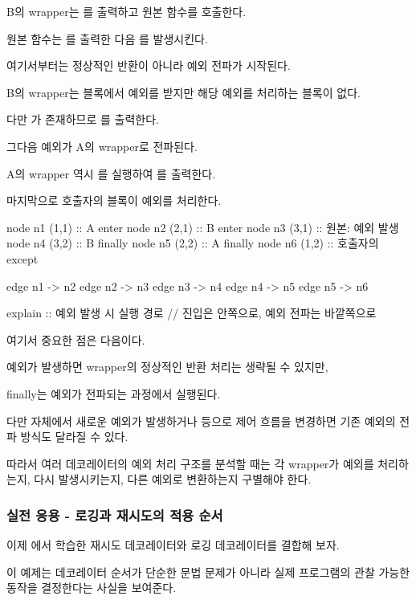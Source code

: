 B의 wrapper는 를 출력하고 원본  함수를 호출한다.

원본 함수는 를 출력한 다음 를 발생시킨다.

여기서부터는 정상적인 반환이 아니라 예외 전파가 시작된다.

B의 wrapper는  블록에서 예외를 받지만 해당 예외를 처리하는  블록이 없다.

다만 가 존재하므로 를 출력한다.

그다음 예외가 A의 wrapper로 전파된다.

A의 wrapper 역시 를 실행하여 를 출력한다.

마지막으로 호출자의  블록이 예외를 처리한다.

\begin{dhkgraph}[uniform]
node n1 (1,1) :: A enter
node n2 (2,1) :: B enter
node n3 (3,1) :: 원본: 예외 발생
node n4 (3,2) :: B finally
node n5 (2,2) :: A finally
node n6 (1,2) :: 호출자의 except

edge n1 -> n2
edge n2 -> n3
edge n3 -> n4
edge n4 -> n5
edge n5 -> n6

explain :: 예외 발생 시 실행 경로 // 진입은 안쪽으로, 예외 전파는 바깥쪽으로
\end{dhkgraph}

여기서 중요한 점은 다음이다.

\begin{dhksmry}[centered]
예외가 발생하면 wrapper의 정상적인 반환 처리는 생략될 수 있지만,

finally는 예외가 전파되는 과정에서 실행된다.
\end{dhksmry}

다만  자체에서 새로운 예외가 발생하거나  등으로 제어 흐름을 변경하면 기존 예외의 전파 방식도 달라질 수 있다.

따라서 여러 데코레이터의 예외 처리 구조를 분석할 때는 각 wrapper가 예외를 처리하는지, 다시 발생시키는지, 다른 예외로 변환하는지 구별해야 한다.

\subsubsection{실전 응용 - 로깅과 재시도의 적용 순서}

이제 에서 학습한 재시도 데코레이터와 로깅 데코레이터를 결합해 보자.

이 예제는 데코레이터 순서가 단순한 문법 문제가 아니라 실제 프로그램의 관찰 가능한 동작을 결정한다는 사실을 보여준다.

